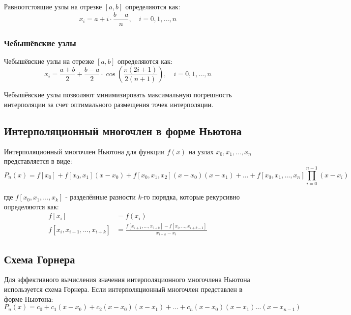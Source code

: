 \documentclass[12pt]{article}
\begin{document}
Равноотстоящие узлы на отрезке $[a, b]$ определяются как:
\begin{equation}
    x_i = a + i \cdot \frac{b - a}{n}, \quad i = 0, 1, \ldots, n
\end{equation}

\subsubsection{Чебышёвские узлы}

Чебышёвские узлы на отрезке $[a, b]$ определяются как:
\begin{equation}
    x_i = \frac{a + b}{2} + \frac{b - a}{2} \cdot \cos\left(\frac{\pi(2i+1)}{2(n+1)}\right), \quad i = 0, 1, \ldots, n
\end{equation}

Чебышёвские узлы позволяют минимизировать максимальную погрешность интерполяции за счет оптимального размещения точек интерполяции.

\subsection{Интерполяционный многочлен в форме Ньютона}

Интерполяционный многочлен Ньютона для функции $f(x)$ на узлах $x_0, x_1, \ldots, x_n$ представляется в виде:
\begin{equation}
    P_n(x) = f[x_0] + f[x_0, x_1](x - x_0) + f[x_0, x_1, x_2](x - x_0)(x - x_1) + \ldots + f[x_0, x_1, \ldots, x_n]\prod_{i=0}^{n-1}(x - x_i)
\end{equation}

где $f[x_0, x_1, \ldots, x_k]$ - разделённые разности $k$-го порядка, которые рекурсивно определяются как:
\begin{align}
    f[x_i] &= f(x_i)\\
    f[x_i, x_{i+1}, \ldots, x_{i+k}] &= \frac{f[x_{i+1}, \ldots, x_{i+k}] - f[x_i, \ldots, x_{i+k-1}]}{x_{i+k} - x_i}
\end{align}

\subsection{Схема Горнера}

Для эффективного вычисления значения интерполяционного многочлена Ньютона используется схема Горнера. Если интерполяционный многочлен представлен в форме Ньютона:
\begin{equation}
    P_n(x) = c_0 + c_1(x-x_0) + c_2(x-x_0)(x-x_1) + \ldots + c_n(x-x_0)(x-x_1)\ldots(x-x_{n-1})
\end{equation}
\end{document}
